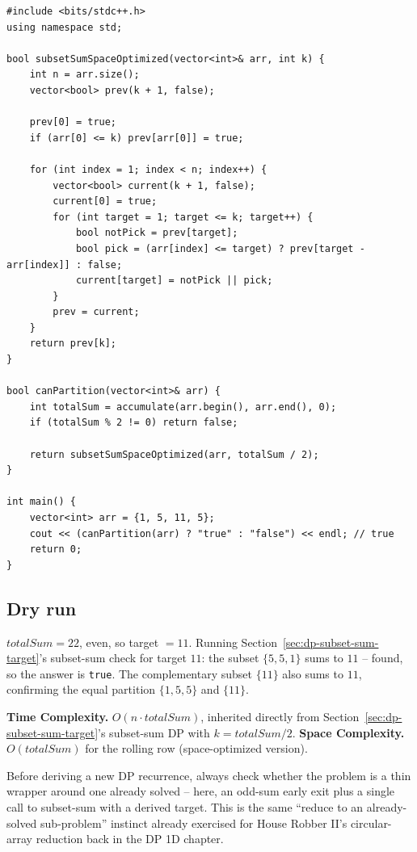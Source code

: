 \begin{lstlisting}
#include <bits/stdc++.h>
using namespace std;

bool subsetSumSpaceOptimized(vector<int>& arr, int k) {
    int n = arr.size();
    vector<bool> prev(k + 1, false);

    prev[0] = true;
    if (arr[0] <= k) prev[arr[0]] = true;

    for (int index = 1; index < n; index++) {
        vector<bool> current(k + 1, false);
        current[0] = true;
        for (int target = 1; target <= k; target++) {
            bool notPick = prev[target];
            bool pick = (arr[index] <= target) ? prev[target - arr[index]] : false;
            current[target] = notPick || pick;
        }
        prev = current;
    }
    return prev[k];
}

bool canPartition(vector<int>& arr) {
    int totalSum = accumulate(arr.begin(), arr.end(), 0);
    if (totalSum % 2 != 0) return false;

    return subsetSumSpaceOptimized(arr, totalSum / 2);
}

int main() {
    vector<int> arr = {1, 5, 11, 5};
    cout << (canPartition(arr) ? "true" : "false") << endl; // true
    return 0;
}
\end{lstlisting}

\subsection*{Dry run}


$\textit{totalSum} = 22$, even, so target $= 11$. Running
Section~\ref{sec:dp-subset-sum-target}'s subset-sum check for target
$11$: the subset $\{5,5,1\}$ sums to $11$ -- found, so the answer is
\texttt{true}. The complementary subset $\{11\}$ also sums to $11$,
confirming the equal partition $\{1,5,5\}$ and $\{11\}$.

\begin{complexitybox}
\textbf{Time Complexity.} $O(n \cdot \textit{totalSum})$, inherited
directly from Section~\ref{sec:dp-subset-sum-target}'s subset-sum DP
with $k = \textit{totalSum}/2$.
\textbf{Space Complexity.} $O(\textit{totalSum})$ for the rolling row
(space-optimized version).
\end{complexitybox}

\begin{takeawaybox}
Before deriving a new DP recurrence, always check whether the problem is
a thin wrapper around one already solved -- here, an odd-sum early exit
plus a single call to subset-sum with a derived target. This is the same
``reduce to an already-solved sub-problem'' instinct already exercised
for House Robber II's circular-array reduction back in
the DP 1D chapter.
\end{takeawaybox}
